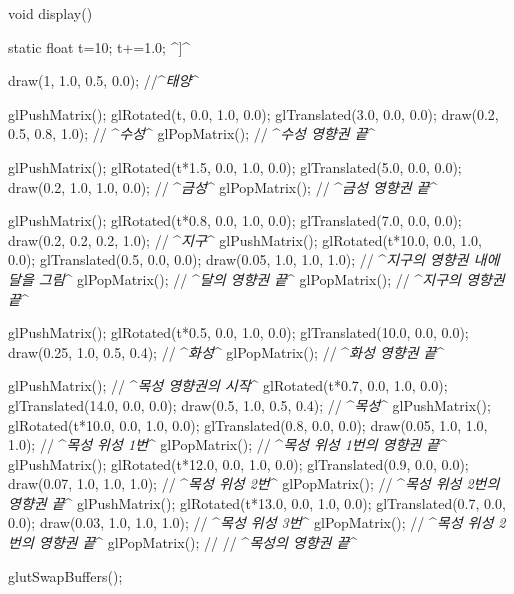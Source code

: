 void display() {
    static float t=10;     t+=1.0;
    ^{\sf [[카레라 설정, 버퍼 지우기, 중심 축 그리기 등을 수행]]}^
    
    draw(1, 1.0, 0.5, 0.0); //^{\it 태양}^
    
    glPushMatrix();
    glRotated(t, 0.0, 1.0, 0.0);
    glTranslated(3.0, 0.0, 0.0);
    draw(0.2, 0.5, 0.8, 1.0);  // ^{\it 수성}^
    glPopMatrix(); // ^{\it 수성 영향권 끝}^
    
    glPushMatrix();
    glRotated(t*1.5, 0.0, 1.0, 0.0);
    glTranslated(5.0, 0.0, 0.0);
    draw(0.2, 1.0, 1.0, 0.0); // ^{\it 금성}^
    glPopMatrix(); // ^{\it 금성 영향권 끝}^
    
    glPushMatrix();
    glRotated(t*0.8, 0.0, 1.0, 0.0);
    glTranslated(7.0, 0.0, 0.0);
    draw(0.2, 0.2, 0.2, 1.0); // ^{\it 지구}^
      glPushMatrix();
      glRotated(t*10.0, 0.0, 1.0, 0.0);
      glTranslated(0.5, 0.0, 0.0);
      draw(0.05, 1.0, 1.0, 1.0); // ^{\it 지구의 영향권 내에 달을 그림}^
      glPopMatrix(); // ^{\it 달의 영향권 끝}^
    glPopMatrix(); // ^{\it 지구의 영향권 끝}^

    glPushMatrix();
    glRotated(t*0.5, 0.0, 1.0, 0.0);
    glTranslated(10.0, 0.0, 0.0);
    draw(0.25, 1.0, 0.5, 0.4); // ^{\it 화성}^
    glPopMatrix(); // ^{\it 화성 영향권 끝}^

    glPushMatrix(); // ^{\it 목성 영향권의 시작}^
    glRotated(t*0.7, 0.0, 1.0, 0.0);
    glTranslated(14.0, 0.0, 0.0);
    draw(0.5, 1.0, 0.5, 0.4); // ^{\it 목성}^
     glPushMatrix();
      glRotated(t*10.0, 0.0, 1.0, 0.0);
      glTranslated(0.8, 0.0, 0.0);  
      draw(0.05, 1.0, 1.0, 1.0); // ^{\it 목성 위성 1번}^
      glPopMatrix(); // ^{\it 목성 위성 1번의 영향권 끝}^
      glPushMatrix();
      glRotated(t*12.0, 0.0, 1.0, 0.0);
      glTranslated(0.9, 0.0, 0.0);
      draw(0.07, 1.0, 1.0, 1.0); // ^{\it 목성 위성 2번}^
      glPopMatrix(); // ^{\it 목성 위성 2번의 영향권 끝}^
      glPushMatrix();
      glRotated(t*13.0, 0.0, 1.0, 0.0);
      glTranslated(0.7, 0.0, 0.0);
      draw(0.03, 1.0, 1.0, 1.0); // ^{\it 목성 위성 3번}^
      glPopMatrix(); //  ^{\it 목성 위성 2번의 영향권 끝}^
    glPopMatrix(); //  // ^{\it 목성의 영향권 끝}^
    
    glutSwapBuffers();
}
